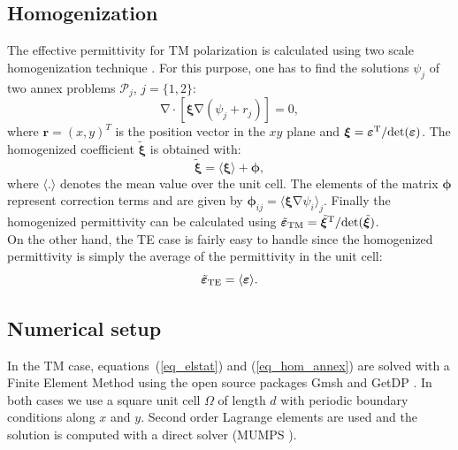\documentclass[%
 reprint,
 amsmath,amssymb,
 aps,
]{revtex4-2}
\newcommand{\B}{\boldsymbol}
\newcommand{\tens}[1]{\B{#1}}
\newcommand{\grad}{\B{\mathrm{\nabla}}}
\renewcommand{\div}{\B{\mathrm{\nabla\cdotp}}}
\newcommand{\epstens}{\tens{\varepsilon}}
\newcommand{\epshom}{\tilde{\epstens}}
\newcommand{\xitens}{\tens{\xi}}
\newcommand{\xihom}{\tilde{\xitens}}
\begin{document}
\subsection*{Homogenization}
The effective permittivity for TM polarization is calculated
using two scale homogenization technique \cite{Allaire92, Guenneau2000}.
For this purpose, one has to find the solutions
$\psi_j$ of two annex problems $\mathcal P_j$, $j=\{1, 2\}$:
\begin{equation}
\div \left[ \xitens \grad(\psi_j + r_j) \right] = 0,
\label{eq_hom_annex}
\end{equation}
where $\B r = (x, y)^T$ is the position vector in the $xy$ plane and
$\xitens=\epstens^{\rm T}/ {\rm det }(\epstens)$.
The homogenized coefficient $\xihom$ is obtained with:
\begin{equation}
\xihom = \langle \xitens \rangle + \B \phi,
\label{eq_hom}
\end{equation}
where $\langle . \rangle$ denotes the mean value over the unit cell.
The elements of the matrix $\B \phi$ represent correction terms and
are given by $\B \phi_{ij} = \langle \xitens \grad \psi_i \rangle_j$.
Finally the homogenized permittivity  can be calculated using $\epshom_{\rm TM}=\xihom^{\rm T}/ {\rm det }(\xihom)$.\\
On the other hand, the TE case is fairly easy to handle since the homogenized permittivity
is simply the average of the permittivity in the unit cell:
\begin{equation}
\epshom_{\rm TE} = \langle \epstens \rangle .
\label{eq_hom_TE}
\end{equation}

\subsection*{Numerical setup}
In the TM case, equations~(\ref{eq_elstat}) and (\ref{eq_hom_annex}) are solved with a Finite Element
Method using the open source packages Gmsh \cite{gmsh} and GetDP \cite{getdp}.
In both cases we use a square unit cell $\Omega$ of length $d$ with periodic boundary
conditions along $x$ and $y$. Second order Lagrange elements are used and the
solution is computed with a direct solver (MUMPS \cite{MUMPS}).


\end{document}
